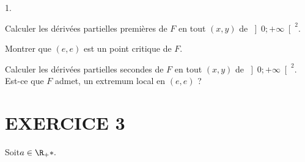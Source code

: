 \documentclass[11pt]{article}%
\begin{document}
\begin{noliste}{1.}
 \setlength{\itemsep}{4mm}
\item Calculer les dérivées partielles premières de $F$ en tout
$\left( x,y\right) $ de $\left] 0; + \infty\right[ ^{2}.$

\item Montrer que $\left( e,e\right) $ est un point critique de $F$.

\item Calculer les dérivées partielles secondes de $F$ en tout
$\left( x,y\right) $ de $\left] 0; + \infty\right[ ^{2}.$ Est-ce que
$F$
admet, un extremum local en $\left( e,e\right) $ ?
\end{noliste}

\section*{EXERCICE 3}

Soit$a\in\R_{+}{\ast}.$
\end{document}
